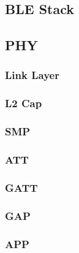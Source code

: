 \subsection{BLE Stack}
\subsection{PHY}
\subsubsection{Link Layer}
\subsubsection{L2 Cap}
\subsubsection{SMP}
\subsubsection{ATT}
\subsubsection{GATT}
\subsubsection{GAP}
\subsubsection{APP}

